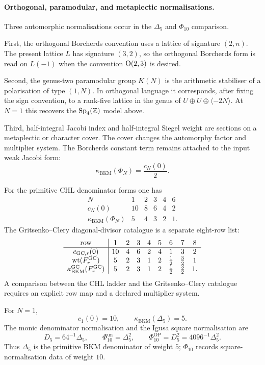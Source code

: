 \paragraph{Orthogonal, paramodular, and metaplectic normalisations.}
Three automorphic normalisations occur in the \(\Delta_5\) and
\(\Phi_{10}\) comparison.

First, the orthogonal Borcherds convention uses a lattice of signature
\((2,n)\).  The present lattice \(L\) has signature \((3,2)\), so the
orthogonal Borcherds form is read on \(L(-1)\) when the convention
\(\mathrm{O}(2,3)\) is desired.

Second, the genus-two paramodular group \(K(N)\) is the arithmetic
stabiliser of a polarisation of type \((1,N)\).  In orthogonal language
it corresponds, after fixing the sign convention, to a rank-five
lattice in the genus of \(U\oplus U\oplus\langle -2N\rangle\).  At
\(N=1\) this recovers the \(\mathrm{Sp}_4(\mathbb{Z})\) model above.

Third, half-integral Jacobi index and half-integral Siegel weight are
sections on a metaplectic or character cover.  The cover changes the
automorphy factor and multiplier system.  The Borcherds constant term
remains attached to the input weak Jacobi form:
\[
  \kappa_{\mathrm{BKM}}(\Phi_N)=\frac{c_N(0)}2.
\]

For the primitive CHL denominator forms one has
\[
\begin{array}{c|ccccc}
N&1&2&3&4&6\\ \hline
c_N(0)&10&8&6&4&2\\
\kappa_{\mathrm{BKM}}(\Phi_N)&5&4&3&2&1.
\end{array}
\]
The Gritsenko--Clery diagonal-divisor catalogue is a separate
eight-row list:
\[
\begin{array}{c|cccccccc}
\text{row}&1&2&3&4&5&6&7&8\\ \hline
c_{\mathrm{GC},r}(0)&10&4&6&2&4&1&3&2\\
\operatorname{wt}(F^{\mathrm{GC}}_r)&5&2&3&1&2&\tfrac12&\tfrac32&1\\
\kappa_{\mathrm{BKM}}^{\mathrm{GC}}(F^{\mathrm{GC}}_r)&5&2&3&1&2&\tfrac12&\tfrac32&1.
\end{array}
\]
A comparison between the CHL ladder and the Gritsenko--Clery catalogue
requires an explicit row map and a declared multiplier system.

For \(N=1\),
\[
  c_1(0)=10,\qquad
  \kappa_{\mathrm{BKM}}(\Delta_5)=5.
\]
The monic denominator normalisation and the Igusa square normalisation
are
\[
  D_5=64^{-1}\Delta_5,\qquad
  \Phi_{10}^{\mathrm{un}}=\Delta_5^2,\qquad
  \Phi_{10}^{\mathrm{OP}}=D_5^2=4096^{-1}\Delta_5^2.
\]
Thus \(\Delta_5\) is the primitive BKM denominator of weight \(5\);
\(\Phi_{10}\) records square-normalisation data of weight \(10\).

